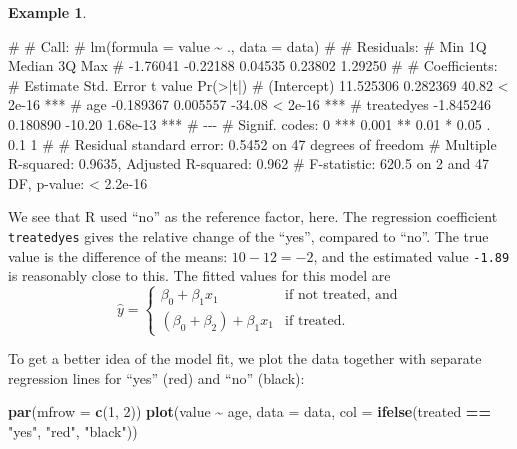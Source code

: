 \documentclass[
  a4paper,
]{article}
\newenvironment{Shaded}{\begin{snugshade}}{\end{snugshade}}
\newcommand{\AttributeTok}[1]{\textcolor[rgb]{0.13,0.29,0.53}{#1}}
\newcommand{\DecValTok}[1]{\textcolor[rgb]{0.00,0.00,0.81}{#1}}
\newcommand{\FunctionTok}[1]{\textcolor[rgb]{0.13,0.29,0.53}{\textbf{#1}}}
\newcommand{\NormalTok}[1]{#1}
\newcommand{\SpecialCharTok}[1]{\textcolor[rgb]{0.81,0.36,0.00}{\textbf{#1}}}
\newcommand{\StringTok}[1]{\textcolor[rgb]{0.31,0.60,0.02}{#1}}
\theoremstyle{definition}
\theoremstyle{definition}
\newtheorem{example}{Example}[section]
\theoremstyle{definition}
\theoremstyle{definition}
\theoremstyle{remark}
\begin{document}
\begin{example}
\begin{Shaded}
\begin{Highlighting}[]
\NormalTok{\# }
\NormalTok{\# Call:}
\NormalTok{\# lm(formula = value \textasciitilde{} ., data = data)}
\NormalTok{\# }
\NormalTok{\# Residuals:}
\NormalTok{\#      Min       1Q   Median       3Q      Max }
\NormalTok{\# {-}1.76041 {-}0.22188  0.04535  0.23802  1.29250 }
\NormalTok{\# }
\NormalTok{\# Coefficients:}
\NormalTok{\#              Estimate Std. Error t value Pr(\textgreater{}|t|)    }
\NormalTok{\# (Intercept) 11.525306   0.282369   40.82  \textless{} 2e{-}16 ***}
\NormalTok{\# age         {-}0.189367   0.005557  {-}34.08  \textless{} 2e{-}16 ***}
\NormalTok{\# treatedyes  {-}1.845246   0.180890  {-}10.20 1.68e{-}13 ***}
\NormalTok{\# {-}{-}{-}}
\NormalTok{\# Signif. codes:  0 \textquotesingle{}***\textquotesingle{} 0.001 \textquotesingle{}**\textquotesingle{} 0.01 \textquotesingle{}*\textquotesingle{} 0.05 \textquotesingle{}.\textquotesingle{} 0.1 \textquotesingle{} \textquotesingle{} 1}
\NormalTok{\# }
\NormalTok{\# Residual standard error: 0.5452 on 47 degrees of freedom}
\NormalTok{\# Multiple R{-}squared:  0.9635,  Adjusted R{-}squared:  0.962 }
\NormalTok{\# F{-}statistic: 620.5 on 2 and 47 DF,  p{-}value: \textless{} 2.2e{-}16}
\end{Highlighting}
\end{Shaded}

We see that R used ``no'' as the reference factor, here. The
regression coefficient \texttt{treatedyes} gives the relative change
of the ``yes'', compared to ``no''. The true value is
the difference of the means: \(10 - 12 = -2\), and the estimated
value \texttt{-1.89} is reasonably close to this. The fitted values
for this model are
\begin{equation*}
  \hat y
  = \begin{cases}
    \beta_0 + \beta_1 x_1 & \mbox{if not treated, and} \\
    (\beta_0 + \beta_2) + \beta_1 x_1 & \mbox{if treated}.
  \end{cases}
\end{equation*}

To get a better
idea of the model fit, we plot the data together with
separate regression lines for ``yes'' (red) and ``no'' (black):

\begin{Shaded}
\begin{Highlighting}[]
\FunctionTok{par}\NormalTok{(}\AttributeTok{mfrow =} \FunctionTok{c}\NormalTok{(}\DecValTok{1}\NormalTok{, }\DecValTok{2}\NormalTok{))}
\FunctionTok{plot}\NormalTok{(value }\SpecialCharTok{\textasciitilde{}}\NormalTok{ age, }\AttributeTok{data =}\NormalTok{ data,}
     \AttributeTok{col =} \FunctionTok{ifelse}\NormalTok{(treated }\SpecialCharTok{==} \StringTok{"yes"}\NormalTok{, }\StringTok{"red"}\NormalTok{, }\StringTok{"black"}\NormalTok{))}


\end{Highlighting}
\end{Shaded}
\end{example}
\end{document}
